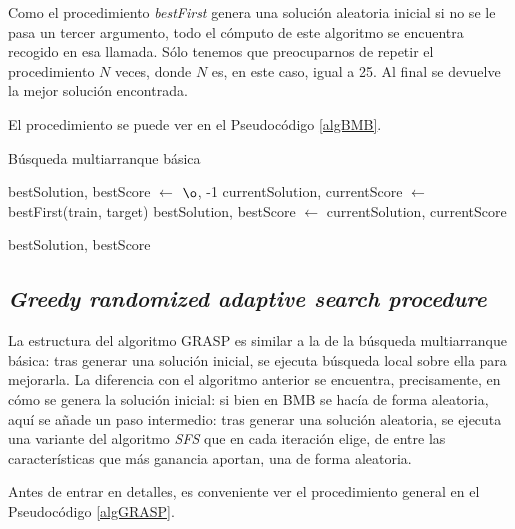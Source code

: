 \documentclass[a4paper, 11pt, titlepage]{article}
\begin{document}
    Como el procedimiento \emph{bestFirst} genera una solución aleatoria inicial si no se le pasa un tercer argumento, todo el cómputo de este algoritmo se encuentra recogido en esa llamada. Sólo tenemos que preocuparnos de repetir el procedimiento $N$ veces, donde $N$ es, en este caso, igual a 25. Al final se devuelve la mejor solución encontrada.

    El procedimiento se puede ver en el Pseudocódigo \ref{algBMB}.

    \begin{algorithm}
        \caption{Búsqueda multiarranque básica}\label{algBMB}
        \begin{algorithmic}[1]

            \State bestSolution, bestScore $\gets$ $\o$, -1
                \State currentSolution, currentScore $\gets$ bestFirst(train, target)
                \State bestSolution, bestScore $\gets$ currentSolution, currentScore
                \EndIf
            \EndFor

            \State \Return bestSolution, bestScore
            \EndFunction
        \end{algorithmic}
    \end{algorithm}

    \subsection{\emph{Greedy randomized adaptive search procedure}}

    La estructura del algoritmo GRASP es similar a la de la búsqueda multiarranque básica: tras generar una solución inicial, se ejecuta búsqueda local sobre ella para mejorarla. La diferencia con el algoritmo anterior se encuentra, precisamente, en cómo se genera la solución inicial: si bien en BMB se hacía de forma aleatoria, aquí se añade un paso intermedio: tras generar una solución aleatoria, se ejecuta una variante del algoritmo \emph{SFS} que en cada iteración elige, de entre las características que más ganancia aportan, una de forma aleatoria.

    Antes de entrar en detalles, es conveniente ver el procedimiento general en el Pseudocódigo \ref{algGRASP}.
\end{document}
